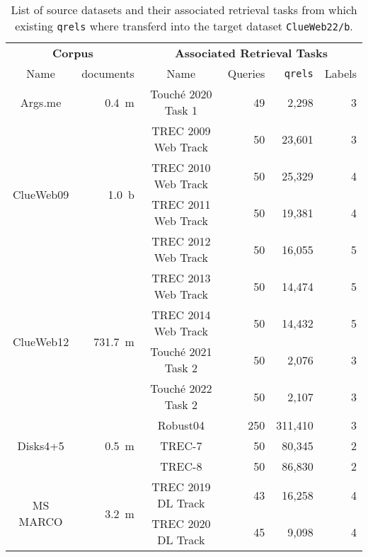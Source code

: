 \begin{table}[h!]
    \centering
    \footnotesize
    \caption{List of source datasets and their associated retrieval tasks from which existing \texttt{qrels} where transferd into the target dataset \texttt{ClueWeb22/b}.}
    \label{table:datasets}
    \begin{tabular}{crcrrr}
        \toprule
        \multicolumn{2}{c}{\textbf{Corpus}} & \multicolumn{4}{c}{\textbf{ Associated Retrieval Tasks}} \\
        \cmidrule(lr){1-2} \cmidrule(lr){3-6}
        Name & documents  & Name & Queries &\texttt{qrels} & Labels \\
        \toprule
        
        Args.me & 0.4~m & Touché 2020 Task 1 & 49 & 2,298 & 3 \\
        \midrule

        \multirow{4}{*}{ClueWeb09} & \multirow{4}{*}{1.0~b} & TREC 2009 Web Track & 50 & 23,601 & 3 \\
        & & TREC 2010 Web Track & 50 & 25,329 & 4 \\
        & & TREC 2011 Web Track & 50 & 19,381 & 4\\
        & & TREC 2012 Web Track & 50 & 16,055 & 5 \\
        \midrule

        \multirow{4}{*}{ClueWeb12} & \multirow{4}{*}{731.7~m} & TREC 2013 Web Track & 50 & 14,474 & 5 \\
        & & TREC 2014 Web Track & 50 & 14,432 & 5 \\
        & & Touché 2021 Task 2 & 50 & 2,076 & 3 \\
        & & Touché 2022 Task 2 & 50 & 2,107 & 3 \\
        \midrule

        \multirow{3}{*}{Disks4+5} & \multirow{3}{*}{0.5~m} & Robust04 & 250 & 311,410 & 3 \\
        & & TREC-7 & 50 & 80,345 & 2 \\
        & & TREC-8 & 50 & 86,830 & 2 \\
        \midrule

        \multirow{2}{*}{MS MARCO} & \multirow{2}{*}{3.2~m} & TREC 2019 DL Track & 43 & 16,258 & 4 \\
        & & TREC 2020 DL Track & 45 & 9,098 & 4 \\
        
        \bottomrule
    \end{tabular}
\end{table}

